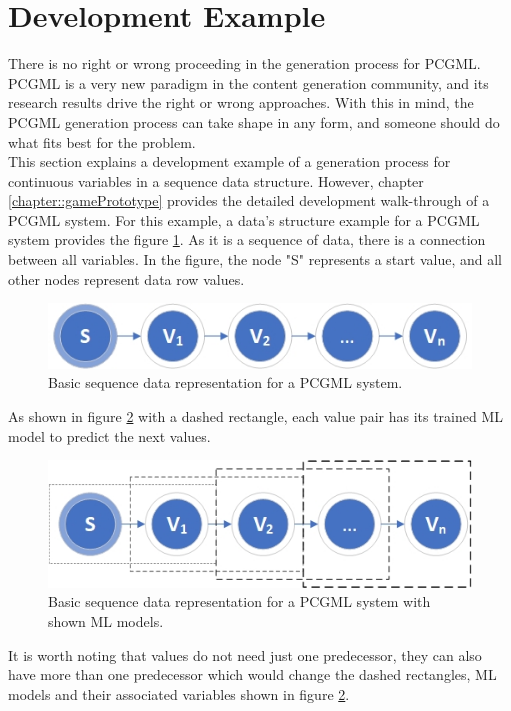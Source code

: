 \documentclass[MGS,Master,english]{twbook}%
\begin{document}
\section{Development Example}
There is no right or wrong proceeding in the generation process for PCGML. PCGML is a very new paradigm in the content generation community, and its research results drive the right or wrong approaches. With this in mind, the PCGML generation process can take shape in any form, and someone should do what fits best for the problem.\\
This section explains a development example of a generation process for continuous variables in a sequence data structure. However, chapter \ref{chapter::gamePrototype} provides the detailed development walk-through of a PCGML system. For this example, a data’s structure example for a PCGML system provides the figure \ref{fig::PCGML::devExample::sequenceBase}. As it is a sequence of data, there is a connection between all variables. In the figure, the node "S" represents a start value, and all other nodes represent data row values. 
\begin{figure}[!htbp]
	\centering
	\includegraphics[width=0.5\linewidth]{PICs/PCGML_development_example_sequence_base}
	\caption{Basic sequence data representation for a PCGML system. }\label{fig::PCGML::devExample::sequenceBase}
\end{figure}
As shown in figure \ref{fig::PCGML::devExample::sequenceWithModels} with a dashed rectangle, each value pair has its trained ML model to predict the next values. 
\begin{figure}[!htbp]
	\centering
	\includegraphics[width=0.5\linewidth]{PICs/PCGML_development_example_sequence_with_models}
	\caption{Basic sequence data representation for a PCGML system with shown ML models.}\label{fig::PCGML::devExample::sequenceWithModels}
\end{figure}
It is worth noting that values do not need just one predecessor, they can also have more than one predecessor which would change the dashed rectangles, ML models and their associated variables shown in figure \ref{fig::PCGML::devExample::sequenceWithModels}.
\end{document}
